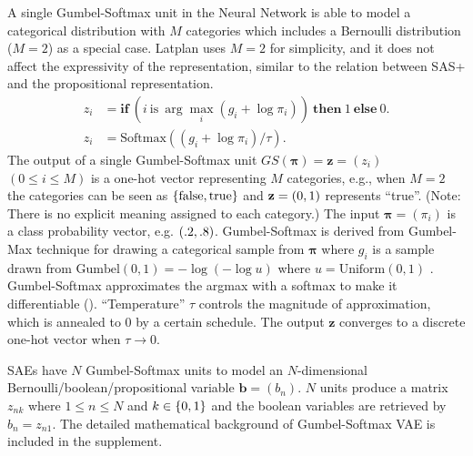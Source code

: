A single Gumbel-Softmax unit in the Neural Network is able to model a categorical distribution with $M$ categories
which includes a Bernoulli distribution ($M=2$) as a special case.
Latplan uses $M=2$ for simplicity, and it does not affect the expressivity of the representation,
similar to the relation between SAS+ and the propositional representation.
% 
\begin{align}
z_i &= \textbf{if}\ (i \ \text{is}\ \arg \max_i (g_i+\log \pi_i)) \ \textbf{then}\ 1\ \textbf{else}\ 0. \label{eq:gumbelmax} \\
z_i &= \text{Softmax}((g_i+\log \pi_i)/\tau).                   \label{eq:gumbelsoftmax}
\end{align}
% 
The output of a single Gumbel-Softmax unit $GS(\boldsymbol{\pi}) = \mathbf{z}=(z_i)$ $(0\leq i \le M)$ is a one-hot vector representing $M$ categories, e.g.,
when $M=2$ the categories can be seen as ${\left\{\text{false},\text{true}\right\}}$ and $\mathbf{z}={\left(0,1\right)}$ represents ``true''.
(Note: There is no explicit meaning assigned to each category.)
The input $\boldsymbol{\pi}=(\pi_i)$ is a class probability vector, e.g. ${\left(.2,.8\right)}$.
Gumbel-Softmax is derived from Gumbel-Max technique \cite[]{maddison2014sampling}
for drawing a categorical sample from $\boldsymbol{\pi}$
where $g_i$ is a sample drawn from
 $\text{Gumbel}(0,1) =-\log (-\log u)$ where $u=\text{Uniform}(0,1)$ \cite{gumbel1954statistical}.
Gumbel-Softmax approximates the argmax with a softmax to make it differentiable ().
``Temperature'' $\tau$ controls the magnitude of approximation, which is annealed to 0 by a certain schedule.
The output $\mathbf{z}$ converges to a discrete one-hot vector when $\tau\rightarrow 0$.

SAEs have $N$ Gumbel-Softmax units
to model an $N$-dimensional Bernoulli/boolean/propositional variable $\mathbf{b}=(b_n)$.
$N$ units produce a matrix $z_{nk}$ where $1\leq n \leq N$ and $k\in{\left\{0,1\right\}}$ and
the boolean variables are retrieved by $b_n=z_{n1}$.
% 
% 
The detailed mathematical background of Gumbel-Softmax VAE is included in the supplement.


